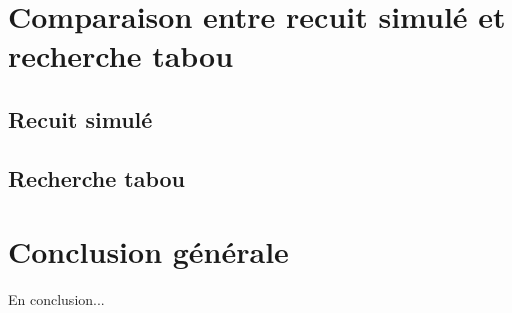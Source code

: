 \section{Comparaison entre recuit simulé et recherche tabou}
\subsection{Recuit simulé}
\newpage
\subsection{Recherche tabou}
\newpage

\section{Conclusion générale}

En conclusion...

\newpage

